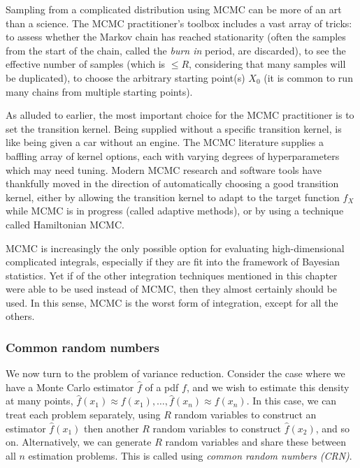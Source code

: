 Sampling from a complicated distribution using MCMC can be more of an art than a science. The MCMC practitioner's toolbox includes a vast array of tricks: to assess whether the Markov chain has reached stationarity (often the samples from the start of the chain, called the \emph{burn in} period, are discarded), to see the effective number of samples (which is $\le R$, considering that many samples will be duplicated), to choose the arbitrary starting point(s) $X_0$ (it is common to run many chains from multiple starting points).

As alluded to earlier, the most important choice for the MCMC practitioner is to set the transition kernel. Being supplied  without a specific transition kernel, is like being given a car without an engine. The MCMC literature supplies a baffling array of kernel options, each with varying degrees of hyperparameters which may need tuning. Modern MCMC research and software tools have thankfully moved in the direction of automatically choosing a good transition kernel, either by allowing the transition kernel to adapt to the target function $f_X$ while MCMC is in progress (called adaptive methods), or by using a technique called Hamiltonian MCMC.

MCMC is increasingly the only possible option for evaluating high-dimensional complicated integrals, especially if they are fit into the framework of Bayesian statistics. Yet if of the other integration techniques mentioned in this chapter were able to be used instead of MCMC, then they almost certainly should be used. In this sense, MCMC is the worst form of integration, except for all the others.


\subsubsection{Common random numbers}

We now turn to the problem of variance reduction. Consider the case where we have a Monte Carlo estimator $\hat{f}$ of a pdf $f$, and we wish to estimate this density at many points, $\hat{f}(x_1) \approx f(x_1), \dots, \hat{f}(x_n) \approx f(x_n)$. In this case, we can treat each problem separately, using $R$ random variables to construct an estimator $\hat{f}(x_1)$ then another $R$ random variables to construct $\hat{f}(x_2)$, and so on. Alternatively, we can generate $R$ random variables and share these between all $n$ estimation problems. This is called using \emph{common random numbers (CRN)}.

